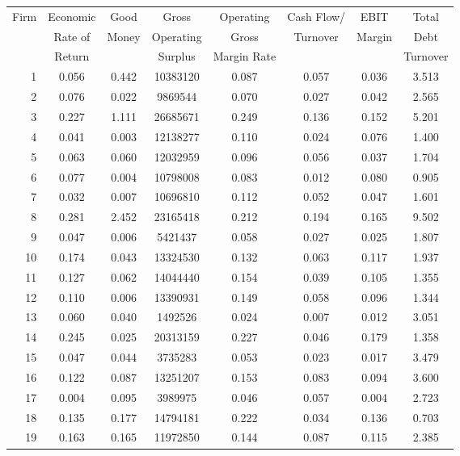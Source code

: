 \documentclass[12pt,letterpaper]{article}
\begin{document}
\begin{center}
\renewcommand{\arraystretch}{1.1}
\begin{tabular}{|r|c|c|c|c|c|c|c|}
\hline
\multirow{3}{*}{Firm} & Economic & Good  & Gross & Operating & Cash Flow/ & EBIT & Total\\
 & Rate of & Money & Operating & Gross & Turnover & Margin & Debt\\
 & Return & & Surplus & Margin Rate & & & Turnover\\
\hline
1  & 0.056 & 0.442 & 10383120 & 0.087 & 0.057 & 0.036 & 3.513 \\ \hline
2  & 0.076 & 0.022 & 9869544  & 0.070 & 0.027 & 0.042 & 2.565 \\ \hline
3  & 0.227 & 1.111 & 26685671 & 0.249 & 0.136 & 0.152 & 5.201 \\ \hline
4  & 0.041 & 0.003 & 12138277 & 0.110 & 0.024 & 0.076 & 1.400 \\ \hline
5  & 0.063 & 0.060 & 12032959 & 0.096 & 0.056 & 0.037 & 1.704 \\ \hline
6  & 0.077 & 0.004 & 10798008 & 0.083 & 0.012 & 0.080 & 0.905 \\ \hline
7  & 0.032 & 0.007 & 10696810 & 0.112 & 0.052 & 0.047 & 1.601 \\ \hline
8  & 0.281 & 2.452 & 23165418 & 0.212 & 0.194 & 0.165 & 9.502 \\ \hline
9  & 0.047 & 0.006 & 5421437  & 0.058 & 0.027 & 0.025 & 1.807 \\ \hline
10 & 0.174 & 0.043 & 13324530 & 0.132 & 0.063 & 0.117 & 1.937 \\ \hline
11 & 0.127 & 0.062 & 14044440 & 0.154 & 0.039 & 0.105 & 1.355 \\ \hline
12 & 0.110 & 0.006 & 13390931 & 0.149 & 0.058 & 0.096 & 1.344 \\ \hline
13 & 0.060 & 0.040 & 1492526  & 0.024 & 0.007 & 0.012 & 3.051 \\ \hline
14 & 0.245 & 0.025 & 20313159 & 0.227 & 0.046 & 0.179 & 1.358 \\ \hline
15 & 0.047 & 0.044 & 3735283  & 0.053 & 0.023 & 0.017 & 3.479 \\ \hline
16 & 0.122 & 0.087 & 13251207 & 0.153 & 0.083 & 0.094 & 3.600 \\ \hline
17 & 0.004 & 0.095 & 3989975  & 0.046 & 0.057 & 0.004 & 2.723 \\ \hline
18 & 0.135 & 0.177 & 14794181 & 0.222 & 0.034 & 0.136 & 0.703 \\ \hline
19 & 0.163 & 0.165 & 11972850 & 0.144 & 0.087 & 0.115 & 2.385 \\ \hline

\end{tabular}
\end{center}
\end{document}
